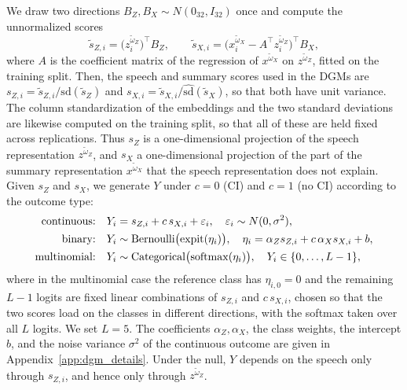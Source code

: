 \documentclass[twoside,11pt]{article}
\begin{document}
We draw two directions $B_Z, B_X \sim N(0_{32}, I_{32})$ once and compute the unnormalized scores
\[
  \tilde s_{Z,i} = \bigl(z_i^{\widetilde\omega_Z}\bigr)^\top B_Z,
  \qquad
  \tilde s_{X,i} = \bigl(x_i^{\widetilde\omega_X} - A^\top z_i^{\widetilde\omega_Z}\bigr)^\top B_X,
\]
where $A$ is the coefficient matrix of the regression of $x^{\widetilde\omega_X}$ on
$z^{\widetilde\omega_Z}$, fitted on the training split. Then, the speech and summary scores used in the DGMs are $s_{Z,i} = \tilde s_{Z,i} / \widehat{\mathrm{sd}}(\tilde s_Z)$ and $s_{X,i} = \tilde s_{X,i} / \widehat{\mathrm{sd}}(\tilde s_X)$, so that both have unit variance. The column standardization of the embeddings and the two standard deviations are likewise computed on the training split, so that all of these are held fixed across replications.
Thus $s_Z$ is a one-dimensional projection of the speech representation $z^{\widetilde\omega_Z}$, and $s_X$ a one-dimensional projection of the part of the summary representation $x^{\widetilde\omega_X}$ that the speech representation does not explain. 
Given $s_Z$ and $s_X$, we generate $Y$ under $c = 0$ (CI) and $c = 1$ (no CI) according to the outcome type:
\begin{align}
\text{continuous:}\quad & Y_i = s_{Z,i} + c\,s_{X,i} + \varepsilon_i, \quad
  \varepsilon_i \sim N(0, \sigma^2), \notag \\
\text{binary:}\quad & Y_i \sim \mathrm{Bernoulli}\bigl(\mathrm{expit}(\eta_i)\bigr), \quad
  \eta_i = \alpha_Z s_{Z,i} + c\,\alpha_X s_{X,i} + b, \label{eq:dgm} \\
\text{multinomial:}\quad & Y_i \sim \mathrm{Categorical}\bigl(\mathrm{softmax}(\eta_i)\bigr),
  \quad Y_i \in \{0, \dots, L-1\}, \notag
\end{align}
where in the multinomial case the reference class has $\eta_{i,0} = 0$ and the remaining $L-1$ logits are fixed linear combinations of $s_{Z,i}$ and $c\,s_{X,i}$, chosen so that the two scores load on the classes in different directions, with the softmax taken over all $L$ logits. 
We set $L = 5$. The coefficients $\alpha_Z, \alpha_X$, the class weights, the intercept $b$, and the noise variance $\sigma^2$ of the continuous outcome are given in Appendix~\ref{app:dgm_details}.
Under the null, $Y$ depends on the speech only through $s_{Z,i}$, and hence only through
$z^{\widetilde\omega_Z}$.
\end{document}
